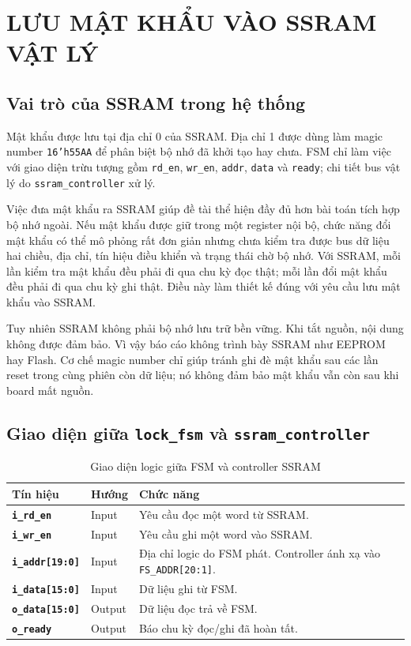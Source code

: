 \documentclass[13pt,a4paper]{article}
\begin{document}
\clearpage
\section{LƯU MẬT KHẨU VÀO SSRAM VẬT LÝ}
\subsection{Vai trò của SSRAM trong hệ thống}
Mật khẩu được lưu tại địa chỉ 0 của SSRAM. Địa chỉ 1 được dùng làm magic number \texttt{16'h55AA} để phân biệt bộ nhớ đã khởi tạo hay chưa. FSM chỉ làm việc với giao diện trừu tượng gồm \texttt{rd\_en}, \texttt{wr\_en}, \texttt{addr}, \texttt{data} và \texttt{ready}; chi tiết bus vật lý do \texttt{ssram\_controller} xử lý.

Việc đưa mật khẩu ra SSRAM giúp đề tài thể hiện đầy đủ hơn bài toán tích hợp bộ nhớ ngoài. Nếu mật khẩu được giữ trong một register nội bộ, chức năng đổi mật khẩu có thể mô phỏng rất đơn giản nhưng chưa kiểm tra được bus dữ liệu hai chiều, địa chỉ, tín hiệu điều khiển và trạng thái chờ bộ nhớ. Với SSRAM, mỗi lần kiểm tra mật khẩu đều phải đi qua chu kỳ đọc thật; mỗi lần đổi mật khẩu đều phải đi qua chu kỳ ghi thật. Điều này làm thiết kế đúng với yêu cầu lưu mật khẩu vào SSRAM.

Tuy nhiên SSRAM không phải bộ nhớ lưu trữ bền vững. Khi tắt nguồn, nội dung không được đảm bảo. Vì vậy báo cáo không trình bày SSRAM như EEPROM hay Flash. Cơ chế magic number chỉ giúp tránh ghi đè mật khẩu sau các lần reset trong cùng phiên còn dữ liệu; nó không đảm bảo mật khẩu vẫn còn sau khi board mất nguồn.

\subsection{Giao diện giữa \texttt{lock\_fsm} và \texttt{ssram\_controller}}
\begin{table}[H]
\centering
\caption{Giao diện logic giữa FSM và controller SSRAM}
\label{tab:fsm_ssram_if}
\begin{tabularx}{\textwidth}{|>{\bfseries}p{3.5cm}|p{1.8cm}|X|}
\hline
\textbf{Tín hiệu} & \textbf{Hướng} & \textbf{Chức năng}\\
\hline
\texttt{i\_rd\_en} & Input & Yêu cầu đọc một word từ SSRAM.\\
\hline
\texttt{i\_wr\_en} & Input & Yêu cầu ghi một word vào SSRAM.\\
\hline
\texttt{i\_addr[19:0]} & Input & Địa chỉ logic do FSM phát. Controller ánh xạ vào \texttt{FS\_ADDR[20:1]}.\\
\hline
\texttt{i\_data[15:0]} & Input & Dữ liệu ghi từ FSM.\\
\hline
\texttt{o\_data[15:0]} & Output & Dữ liệu đọc trả về FSM.\\
\hline
\texttt{o\_ready} & Output & Báo chu kỳ đọc/ghi đã hoàn tất.\\
\hline
\end{tabularx}
\end{table}
\end{document}

